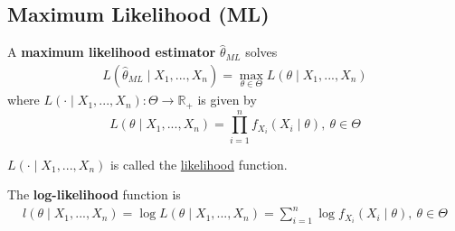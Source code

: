 \documentclass[11pt]{elegantbook}
\begin{document}
\subsection{Maximum Likelihood (ML)}
\begin{definition}
    \normalfont
    A \textbf{maximum likelihood estimator} $\hat{\theta}_{ML}$ solves
    \begin{equation}
        \begin{aligned}
            L(\hat{\theta}_{ML}\mid X_1,...,X_n)=\max_{\theta\in\Theta} L(\theta\mid X_1,...,X_n)
        \end{aligned}
        \nonumber
    \end{equation}
    where $L(\cdot\mid X_1,...,X_n):\Theta \rightarrow \mathbb{R}_+$ is given by $$L(\theta\mid X_1,...,X_n)=\prod_{i=1}^n f_{X_i}(X_i\mid\theta),\ \theta\in\Theta$$
\end{definition}
\begin{remark}
    $L(\cdot\mid X_1,...,X_n)$ is called the \underline{likelihood} function.
\end{remark}
\begin{definition}
    \normalfont
    The \textbf{log-likelihood} function is
    \begin{equation}
        \begin{aligned}
            l(\theta\mid X_1,...,X_n)=\log L(\theta\mid X_1,...,X_n)=\sum_{i=1}^n \log f_{X_i}(X_i\mid\theta),\ \theta\in\Theta
        \end{aligned}
        \nonumber
    \end{equation}
\end{definition}
\end{document}
